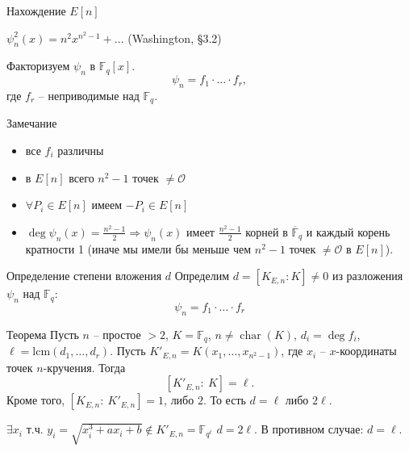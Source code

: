 \documentclass{beamer}
\begin{document}
\begin{frame}{Нахождение $E[n]$}
    \begin{center}
       $\psi_n^2(x) = {n^2}{x^{{n^2} - 1}} +  \ldots$ \hfill {\small(Washington, \S3.2)}
    \end{center}

Факторизуем $\psi_n$ в $\mathbb{F}_q[x]$.
\[\psi_n = f_1 \cdot \ldots \cdot f_r,\]
где $f_r$ -- неприводимые над $\mathbb{F}_q$.
\begin{block}{Замечание}
\begin{itemize}
    \item все $f_i$ различны
    \item в $E[n]$ всего ${n^2} - 1$ точек $\neq \mathcal{O}$
    \item $\forall P_i \in E[n]$ имеем $-P_i \in E[n]$
    \item $\deg {\psi _n}( x ) = \frac{{{n^2} - 1}}{2} \Rightarrow {\psi _n}( x )$ имеет $\frac{{{n^2} - 1}}{2}$ корней в $\overline{\mathbb{F}}_q$ и каждый корень кратности 1 (иначе мы имели бы меньше чем ${n^2} - 1$ точек $ \ne \mathcal{O}$ в $E[n]$). 
\end{itemize}
\end{block}
\end{frame}

\begin{frame}{Определение степени вложения $d$}
Определим $d = [K_{E,n} : K] \ne 0$ из разложения $\psi_n$ над $\mathbb{F}_q$: 
\[\psi_n = f_1 \cdot \ldots \cdot f_r\]
\begin{block}{Теорема}
Пусть $n$ -- простое $> 2$, $K = \mathbb{F}_q$, $n \ne \operatorname{char}(K)$,
$d_i = \deg {f_i}$,
$\ell = \mathrm{lcm}(d_1, \ldots, d_r)$.
Пусть $K'_{E,n} = K( {{x_1}, \ldots, {x_{{n^2} - 1}}})$, где ${x_i}$ -- $x$-координаты точек $n$-кручения. Тогда 
    \[[ {K'_{E,n}:\:K} ] = \ell.
    \]
    Кроме того, $[ {{K_{E,n}}:\:K'_{E,n}} ] = 1$, либо $2$. То есть $d = \ell$ либо $2\ell$. 
\end{block}

\structure{$\triangleleft$}
    $\exists x_i$ т.ч. $y_i = \sqrt{x_i^3 + a x_i + b} \not\in K'_{E,n} = \mathbb{F}_{q^\ell}$ \structure{$\implies$} $d = 2 \ell$.
    В противном случае: $d = \ell$.
\structure{$\triangleright$}
\end{frame}
\end{document}
